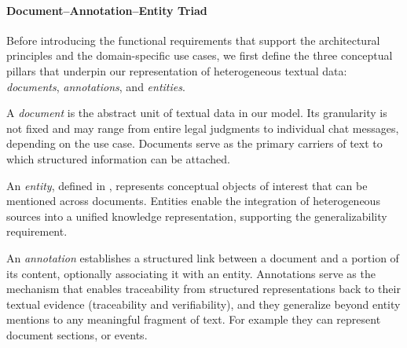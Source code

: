 \paragraph{Document--Annotation--Entity Triad}
Before introducing the functional requirements that support the architectural principles and the domain-specific use cases, we first define the three conceptual pillars that underpin our representation of heterogeneous textual data: \emph{documents}, \emph{annotations}, and \emph{entities}.

A \emph{document} is the abstract unit of textual data in our model. Its granularity is not fixed and may range from entire legal judgments to individual chat messages, depending on the use case. Documents serve as the primary carriers of text to which structured information can be attached.

An \emph{entity}, defined in , represents conceptual objects of interest that can be mentioned across documents. Entities enable the integration of heterogeneous sources into a unified knowledge representation, supporting the generalizability requirement.

An \emph{annotation} establishes a structured link between a document and a portion of its content, optionally associating it with an entity. Annotations serve as the mechanism that enables traceability from structured representations back to their textual evidence (traceability and verifiability), and they generalize beyond entity mentions to any meaningful fragment of text. For example they can represent document sections, or events.


